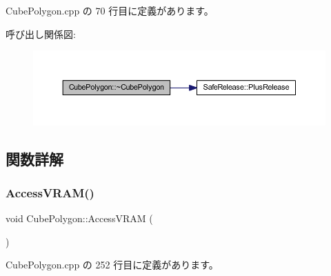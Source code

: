  Cube\+Polygon.\+cpp の 70 行目に定義があります。

呼び出し関係図\+:\nopagebreak
\begin{figure}[H]
\begin{center}
\leavevmode
\includegraphics[width=350pt]{class_cube_polygon_ae6cd078c65ba32e8da56b8f7d5e92d2a_cgraph}
\end{center}
\end{figure}


\subsection{関数詳解}
\mbox{\label{class_cube_polygon_a715db255bf7ebd3c3aec2095d73b9399}} 
\subsubsection{\texorpdfstring{Access\+V\+R\+A\+M()}{AccessVRAM()}}
{\footnotesize\ttfamily void Cube\+Polygon\+::\+Access\+V\+R\+AM (\begin{DoxyParamCaption}{ }\end{DoxyParamCaption})\hspace{0.3cm}{\ttfamily [private]}}



 Cube\+Polygon.\+cpp の 252 行目に定義があります。

